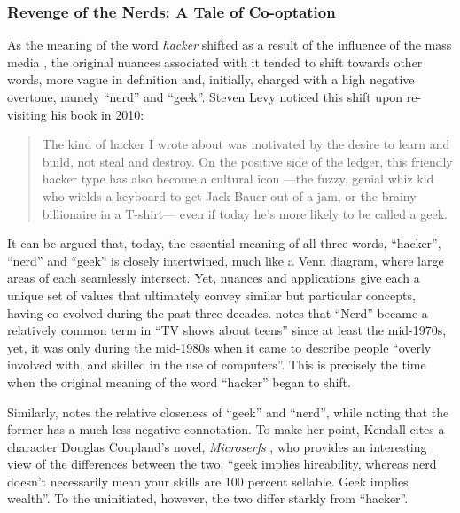 \subsubsection{Revenge of the Nerds: A Tale of Co-optation} %

As the meaning of the word \textit{hacker} shifted as a result of the influence of the mass media \citep{kinney93}, the original nuances associated with it tended to shift towards other words, more vague in definition and, initially, charged with a high negative overtone, namely ``nerd'' and ``geek''. Steven Levy noticed this shift upon re-visiting his book in 2010:

\begin{quote}
The kind of hacker I wrote about was motivated by the desire to learn and build, not steal and destroy. On the positive side of the ledger, this friendly hacker type has also become a cultural icon ---the fuzzy, genial whiz kid who wields a keyboard to get Jack Bauer out of a jam, or the brainy billionaire in a T-shirt--- even if today he's more likely to be called a geek. \citep{levy10}
\end{quote}

It can be argued that, today, the essential meaning of all three words, ``hacker'', ``nerd'' and ``geek'' is closely intertwined, much like a Venn diagram, where large areas of each seamlessly intersect. Yet, nuances and applications give each a unique set of values that ultimately convey similar but particular concepts, having co-evolved during the past three decades. \citet{kendall99} notes that ``Nerd'' became a relatively common term in ``TV shows about teens'' since at least the mid-1970s, yet, it was only during the mid-1980s when it came to describe people ``overly involved with, and skilled in the use of computers''. This is precisely the time when the original meaning of the word ``hacker'' began to shift.

Similarly, \citeauthor{kendall99} notes the relative closeness of ``geek'' and ``nerd'', while noting that the former has a much less negative connotation. To make her point, Kendall cites a character Douglas Coupland's novel, \textit{Microserfs} \citeyearpar{coupland95}, who provides an interesting view of the differences between the two: ``geek implies hireability, whereas nerd doesn't necessarily mean your skills are 100 percent sellable. Geek implies wealth''. To the uninitiated, however, the two differ starkly from ``hacker''.

